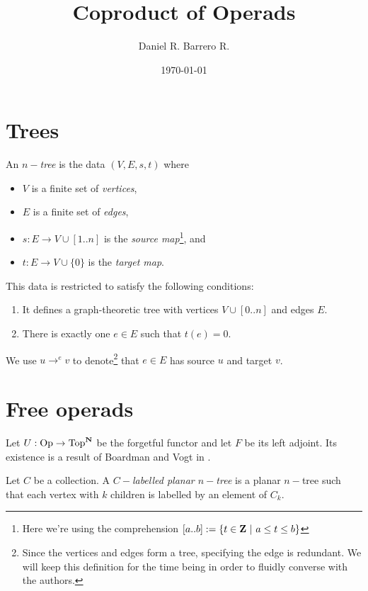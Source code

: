 \documentclass{amsart}
\title{Coproduct of Operads}
\author{Daniel R. Barrero R.}
\date{\today}
\begin{document}

\maketitle

\section{Trees}



\begin{defn}\label{def-tree}
	An $n-$\emph{tree} is the data $(V, E, s, t)$ where
	\begin{itemize}
		\item $V$ is a finite set of \emph{vertices},
		\item $E$ is a finite set of \emph{edges},
		\item $s : E \to V \cup [1..n]$ is the
			\emph{source map}\footnote{Here we're using the
			comprehension $[a..b] :=
			\{t \in \mathbf{Z} \ | \ a \leq t \leq b\}$}, and
		\item $t : E \to V \cup \{0\}$ is the \emph{target map}.
	\end{itemize}
	This data is restricted to satisfy the following conditions:
	\begin{enumerate}
		\item It defines a graph-theoretic tree with vertices
			$V \cup [0..n]$ and edges $E$.
		\item There is exactly one $e \in E$ such that $t(e) = 0$.
	\end{enumerate}
	We use $u \to^{e} v$ to denote\footnote{Since the vertices and
	edges form a tree,  specifying the edge is redundant. We will keep
	this definition for the time being in order to fluidly converse
	with the authors.} that $e \in E$ has source $u$ and target $v$.
\end{defn}




\section{Free operads}

Let $U : \mathrm{Op} \to \mathrm{Top}^{\mathbf{N}}$ be the forgetful functor and
let $F$ be its left adjoint. Its existence is a result of Boardman and Vogt
in \cite{bv-hiasots}.

\begin{defn}
	Let $C$ be a collection. A \emph{$C-$labelled planar $n-$tree} is a
	planar $n-$tree such that each vertex with $k$ children is labelled
	by an element of $C_k$.
\end{defn}
\end{document}
